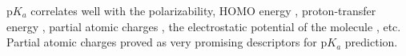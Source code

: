 p$K_a$ correlates well with the polarizability, HOMO energy \cite{Gross2001},
proton-transfer energy \cite{Gross2001},
partial atomic charges \cite{Citra1999, Gross2002, Kreye2009, Svobodova2011, Svobodova2013},
the electrostatic potential of the molecule \cite{Liu2009}, etc.
Partial atomic charges proved as very promising
descriptors \cite{Citra1999, Gross2002, Kreye2009, Svobodova2011, Svobodova2013} for p$K_a$
prediction.


